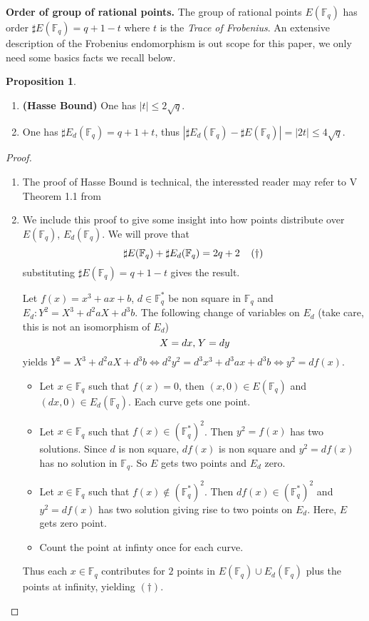 \documentclass[10pt]{article}
\theoremstyle{definition}
\newtheorem{proposition}{Proposition}
\newcommand{\F}{\mathbb{F}}
\begin{document}
\noindent \textbf{Order of group of rational points.} The group of rational points $E(\F_q)$ has order $\sharp E(\F_q) = q + 1 -t$ where $t$ is the \textsl{Trace of Frobenius}.
An extensive description of the Frobenius endomorphism is out scope for this paper, we only need some basics facts we recall below.

\begin{proposition}
\begin{enumerate}
\item \textbf{(Hasse Bound)} One has $|t|  \leq 2 \sqrt{q}$.
\item One has $\sharp{} E_d(\F_q) = q+1+t$, thus $|\sharp{} E_d(\F_q) - \sharp{}E(\F_q)| = |2t|  \leq 4\sqrt{q}$.
\end{enumerate}
\end{proposition}
\begin{proof}
\begin{enumerate}
\item The proof of Hasse Bound is technical, the interessted reader may refer to V Theorem 1.1 from \cite{Silverman:EC} 
\item We include this proof to give some insight into how points distribute over $E(\F_q)$, $E_d(\F_q)$.
We will prove that 
\[  \sharp{}E(\F_q) + \sharp{}E_d(\F_q) = 2q+2 \mkern20mu (\dagger)\]
substituting $\sharp E(\F_q) = q + 1 -t$ gives the result.

Let $f(x) = x^3+ax+b$, $d \in \F_q^*$ be non square in $\F_q$ and $E_d : Y^2 = X^3+d^2aX+d^3b$.
The following change of variables on $E_d$ (take care, this is not an isomorphism of $E_d$)
\[ X = dx, \mkern2mu Y = dy \]
yields $ Y^2 = X^3+d^2aX+d^3b \Leftrightarrow d^2y^2 = d^3x^3+d^3ax+d^3b \Leftrightarrow y^2 = df(x)$. 

\begin{itemize}
\item Let $x \in \F_q$ such that $f(x) = 0$, then $(x,0) \in E(\F_q)$ and $(dx,0) \in E_d(\F_q)$.
Each curve gets one point.
\item Let $x \in \F_q$ such that $f(x) \in (\F_q^*)^2$.
Then $y^2 = f(x)$ has two solutions.
Since $d$ is non square, $df(x)$ is non square and $y^2 = df(x)$ has no solution in $\F_q$.
So $E$ gets two points and $E_d$ zero.
\item  Let $x \in \F_q$ such that $f(x) \notin (\F_q^*)^2$.
Then $df(x) \in (\F_q^*)^2$ and $y^2 = df(x)$ has two solution giving rise to two points on $E_d$.
Here, $E$ gets zero point.
\item Count the point at infinty once for each curve.
\end{itemize}
Thus each $x \in \F_q$ contributes for $2$ points in $E(\F_q) \cup E_d(\F_q)$ plus the points at infinity, yielding $(\dagger)$.
\end{enumerate}
\end{proof}
\end{document}
